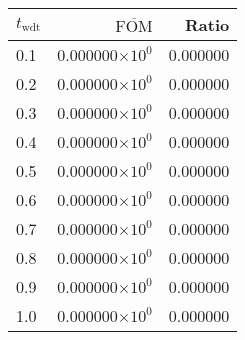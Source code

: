 \begin{tabular}{lrr}
\toprule
$t_{\mathrm{wdt}}$ & $\overline{\mathrm{FOM}}$ &    Ratio \\
\midrule
               0.1 &   0.000000$\times 10^{0}$ & 0.000000 \\
               0.2 &   0.000000$\times 10^{0}$ & 0.000000 \\
               0.3 &   0.000000$\times 10^{0}$ & 0.000000 \\
               0.4 &   0.000000$\times 10^{0}$ & 0.000000 \\
               0.5 &   0.000000$\times 10^{0}$ & 0.000000 \\
               0.6 &   0.000000$\times 10^{0}$ & 0.000000 \\
               0.7 &   0.000000$\times 10^{0}$ & 0.000000 \\
               0.8 &   0.000000$\times 10^{0}$ & 0.000000 \\
               0.9 &   0.000000$\times 10^{0}$ & 0.000000 \\
               1.0 &   0.000000$\times 10^{0}$ & 0.000000 \\
\bottomrule
\end{tabular}
